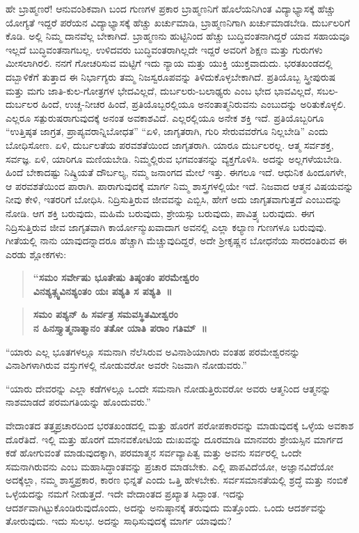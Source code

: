 ಹೇ ಬ್ರಾಹ್ಮಣರೆ! ಆನುವಂಶಿಕವಾಗಿ ಬಂದ ಗುಣಗಳ ಪ್ರಕಾರ ಬ್ರಾಹ್ಮಣನಿಗೆ ಹೊಲೆಯನಿಗಿಂತ ವಿದ್ಯಾಭ್ಯಾಸಕ್ಕೆ ಹೆಚ್ಚು ಯೋಗ್ಯತೆ ಇದ್ದರೆ ಪರೆಯನ ವಿದ್ಯಾಭ್ಯಾಸಕ್ಕೆ ಹೆಚ್ಚು ಖರ್ಚುಮಾಡಿ, ಬ್ರಾಹ್ಮಣನಿಗಾಗಿ ಖರ್ಚುಮಾಡಬೇಡಿ. ದುರ್ಬಲರಿಗೆ ಕೊಡಿ. ಅಲ್ಲಿ ನಿಮ್ಮ ದಾನವೆಲ್ಲ ಬೇಕಾಗಿದೆ. ಬ್ರಾಹ್ಮಣನು ಹುಟ್ಟಿನಿಂದ ಹೆಚ್ಚು ಬುದ್ಧಿವಂತನಾಗಿದ್ದರೆ ಯಾವ ಸಹಾಯವೂ ಇಲ್ಲದೆ ಬುದ್ಧಿವಂತನಾಗಬಲ್ಲ. ಉಳಿದವರು ಬುದ್ಧಿವಂತರಾಗಿಲ್ಲದೇ ಇದ್ದರೆ ಅವರಿಗೆ ಶಿಕ್ಷಣ ಮತ್ತು ಗುರುಗಳು ಮೀಸಲಾಗಿರಲಿ. ನನಗೆ ಗೋಚರಿಸುವ ಮಟ್ಟಿಗೆ ಇದು ನ್ಯಾಯ ಮತ್ತು ಯುಕ್ತಿ ಯುಕ್ತವಾದುದು. ಭರತಖಂಡದಲ್ಲಿ ದಬ್ಬಾಳಿಕೆಗೆ ತುತ್ತಾದ ಈ ನಿರ್ಭಾಗ್ಯರು ತಮ್ಮ ನಿಜಸ್ವರೂಪವನ್ನು ತಿಳಿದುಕೊಳ್ಳಬೇಕಾಗಿದೆ. ಪ್ರತಿಯೊಬ್ಬ ಸ್ತ್ರೀಪುರುಷ ಮತ್ತು ಮಗು ಜಾತಿ-ಕುಲ-ಗೋತ್ರಗಳ ಭೇದವಿಲ್ಲದೆ, ದುರ್ಬಲರು-ಬಲಾಢ್ಯರು ಎಂಬ ಭೇದ ಭಾವವಿಲ್ಲದೆ, ಸಬಲ-ದುರ್ಬಲರ ಹಿಂದೆ, ಉಚ್ಚ-ನೀಚರ ಹಿಂದೆ, ಪ್ರತಿಯೊಬ್ಬರಲ್ಲಿಯೂ ಅನಂತಾತ್ಮನಿರುವನು ಎಂಬುದನ್ನು ಅರಿತುಕೊಳ್ಳಲಿ. ಎಲ್ಲರೂ ಸತ್ಪುರುಷರಾಗುವುದಕ್ಕೆ ಅನಂತ ಅವಕಾಶವಿದೆ. ಎಲ್ಲರಲ್ಲಿಯೂ ಅನೇಕ ಶಕ್ತಿ ಇದೆ. ಪ್ರತಿಯೊಬ್ಬರಿಗೂ “ಉತ್ತಿಷ್ಠತ ಜಾಗ್ರತ, ಪ್ರಾಪ್ಯವರಾನ್ನಿಬೋಧತ” “ಏಳಿ, ಜಾಗೃತರಾಗಿ, ಗುರಿ ಸೇರುವವರೆಗೂ ನಿಲ್ಲಬೇಡಿ” ಎಂದು ಬೋಧಿಸೋಣ. ಏಳಿ, ದುರ್ಬಲತೆಯ ಪರವಶತೆಯಿಂದ ಜಾಗೃತರಾಗಿ. ಯಾರೂ ದುರ್ಬಲರಲ್ಲ. ಆತ್ಮ ಸರ್ವಶಕ್ತ, ಸರ್ವಜ್ಞ. ಏಳಿ, ಯಾರಿಗೂ ಮಣಿಯಬೇಡಿ. ನಿಮ್ಮಲ್ಲಿರುವ ಭಗವಂತನನ್ನು ವ್ಯಕ್ತಗೊಳಿಸಿ. ಅದನ್ನು ಅಲ್ಲಗಳೆಯಬೇಡಿ. ಹಿಂದೆ ಬೇಕಾದಷ್ಟು ನಿಷ್ಕ್ರಿಯತೆ ದೌರ್ಬಲ್ಯ, ನಮ್ಮ ಜನಾಂಗದ ಮೇಲೆ ಇತ್ತು. ಈಗಲೂ ಇದೆ. ಆಧುನಿಕ ಹಿಂದೂಗಳೇ, ಆ ಪರವಶತೆಯಿಂದ ಪಾರಾಗಿ. ಪಾರಾಗುವುದಕ್ಕೆ ಮಾರ್ಗ ನಿಮ್ಮ ಶಾಸ್ತ್ರಗಳಲ್ಲಿಯೇ ಇದೆ. ನಿಜವಾದ ಆತ್ಮನ ವಿಷಯವನ್ನು ನೀವು ಕೇಳಿ, ಇತರರಿಗೆ ಬೋಧಿಸಿ. ನಿದ್ರಿಸುತ್ತಿರುವ ಜೀವವನ್ನು ಎಬ್ಬಿಸಿ, ಹೇಗೆ ಅದು ಜಾಗೃತವಾಗುತ್ತದೆ ಎಂಬುದನ್ನು ನೋಡಿ. ಆಗ ಶಕ್ತಿ ಬರುವುದು, ಮಹಿಮೆ ಬರುವುದು, ಶ್ರೇಯಸ್ಸು ಬರುವುದು, ಪಾವಿತ್ರ್ಯ ಬರುವುದು. ಈಗ ನಿದ್ರಿಸುತ್ತಿರುವ ಜೀವ ಜಾಗೃತವಾಗಿ ಕಾರ್ಯೋನ್ಮುಖವಾದಾಗ ಅವನಲ್ಲಿ ಎಲ್ಲಾ ಕಲ್ಯಾಣ ಗುಣಗಳೂ ಬರುವುವು. ಗೀತೆಯಲ್ಲಿ ನಾನು ಯಾವುದನ್ನಾದರೂ ಹೆಚ್ಚಾಗಿ ಮೆಚ್ಚುವುದಿದ್ದರೆ, ಅದೇ ಶ‍್ರೀಕೃಷ್ಣನ ಬೋಧನೆಯ ಸಾರದಂತಿರುವ ಈ ಎರಡು ಶ್ಲೋಕಗಳು:

\begin{verse}
\textbf{“ಸಮಂ ಸರ್ವೇಷು ಭೂತೇಷು ತಿಷ್ಠಂತಂ ಪರಮೇಶ್ವರಂ}\\\textbf{ವಿನಶ್ಯತ್ಸ್ವವಿನಶ್ಯಂತಂ ಯಃ ಪಶ್ಯತಿ ಸ ಪಶ್ಯತಿ~॥}
\end{verse}

\begin{verse}
\textbf{ಸಮಂ ಪಶ್ಯನ್​ ಹಿ ಸರ್ವತ್ರ ಸಮವಸ್ಥಿತಮೀಶ್ವರಂ}\\\textbf{ನ ಹಿನಸ್ತ್ಯಾತ್ಮನಾತ್ಮಾನಂ ತತೋ ಯಾತಿ ಪರಾಂ ಗತಿಮ್​~॥}
\end{verse}

“ಯಾರು ಎಲ್ಲ ಭೂತಗಳಲ್ಲೂ ಸಮನಾಗಿ ನೆಲೆಸಿರುವ ಅವಿನಾಶಿಯಾಗಿರು ವಂತಹ ಪರಮೇಶ್ವರನನ್ನು ವಿನಾಶಿಗಳಾಗಿರುವ ವಸ್ತುಗಳಲ್ಲಿ ನೋಡುವರೋ ಅವರೇ ನಿಜವಾಗಿ ನೋಡುವರು.”

“ಯಾರು ದೇವರನ್ನು ಎಲ್ಲಾ ಕಡೆಗಳಲ್ಲೂ ಒಂದೇ ಸಮನಾಗಿ ನೋಡುತ್ತಿರುವರೋ ಅವರು ಆತ್ಮನಿಂದ ಆತ್ಮನನ್ನು ನಾಶಮಾಡದೆ ಪರಮಗತಿಯನ್ನು ಹೊಂದುವರು.”

ವೇದಾಂತದ ತತ್ತ್ವಪ್ರಚಾರದಿಂದ ಭರತಖಂಡದಲ್ಲಿ ಮತ್ತು ಹೊರಗೆ ಪರೋಪಕಾರವನ್ನು ಮಾಡುವುದಕ್ಕೆ ಒಳ್ಳೆಯ ಅವಕಾಶ ದೊರೆತಿದೆ. ಇಲ್ಲಿ ಮತ್ತು ಹೊರಗೆ ಮಾನವಕೋಟಿಯ ದುಃಖವನ್ನು ದೂರಮಾಡಿ ಮಾನವರು ಶ್ರೇಯಸ್ಸಿನ ಮಾರ್ಗದ ಕಡೆ ಹೋಗುವಂತೆ ಮಾಡುವುದಕ್ಕಾಗಿ, ಪರಮಾತ್ಮನ ಸರ್ವವ್ಯಾಪಿತ್ವ ಮತ್ತು ಅವನು ಸರ್ವರಲ್ಲಿ ಒಂದೇ ಸಮನಾಗಿರುವನು ಎಂಬ ಮಹಾಸಿದ್ಧಾಂತವನ್ನು ಪ್ರಚಾರ ಮಾಡಬೇಕು. ಎಲ್ಲಿ ಪಾಪವಿದೆಯೋ, ಅಜ್ಞಾನವಿದೆಯೋ ಅದಕ್ಕೆಲ್ಲಾ, ನಮ್ಮ ಶಾಸ್ತ್ರಪ್ರಕಾರ, ಕಾರಣ ಭಿನ್ನತೆ ಎಂದು ಒತ್ತಿ ಹೇಳಬೇಕು. ಸರ್ವಸಮಾನತೆಯಲ್ಲಿ ಶ್ರದ್ಧೆ ಮತ್ತು ನಂಬಿಕೆ ಒಳ್ಳೆಯದನ್ನು ನಮಗೆ ನೀಡುತ್ತದೆ. ಇದೇ ವೇದಾಂತದ ಪ್ರಖ್ಯಾತ ಸಿದ್ಧಾಂತ. ಇದನ್ನು ಆದರ್ಶವಾಗಿಟ್ಟುಕೊಂಡಿರುವುದೊಂದು, ಅದನ್ನು ಅನುಷ್ಠಾನಕ್ಕೆ ತರುವುದು ಮತ್ತೊಂದು. ಒಂದು ಆದರ್ಶವನ್ನು ತೋರುವುದು. ಇದು ಸುಲಭ. ಅದನ್ನು ಸಾಧಿಸುವುದಕ್ಕೆ ಮಾರ್ಗ ಯಾವುದು?

